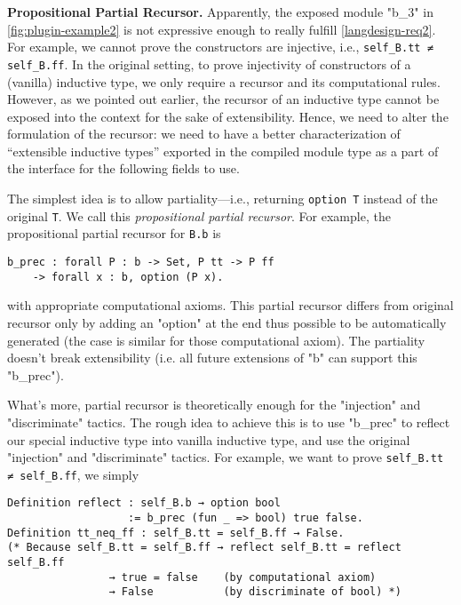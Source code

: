\textbf{Propositional Partial Recursor.}
Apparently, the exposed module "b_3" in \cref{fig:plugin-example2} is
not expressive enough to really fulfill \ref{langdesign-req2}. For
example, we cannot prove the constructors are injective, i.e.,
\texttt{self_B.tt ≠ self_B.ff}. In the original setting, to
prove injectivity of constructors of a (vanilla) inductive type, we only
require a recursor and its computational rules. However, as we pointed
out earlier, the recursor of an inductive type cannot be exposed into
the context for the sake of extensibility. Hence, we need to alter the
formulation of the recursor: we need to have a better
characterization of ``extensible inductive types'' exported in the
compiled module type as a part of the interface for the following fields
to use.


The simplest idea is to allow partiality---i.e., returning
\texttt{option T} instead of the original \texttt{T}.
We call this \textit{propositional partial recursor}.
For example, the propositional partial recursor for \texttt{B.b} is
\begin{verbatim}
b_prec : forall P : b -> Set, P tt -> P ff
    -> forall x : b, option (P x).
\end{verbatim}
with appropriate computational axioms. This partial recursor differs from original recursor only by adding an "option" at the end thus possible to be automatically generated (the case is similar for those computational axiom). The partiality doesn't break
extensibility (i.e. all future extensions of "b" can support this
"b_prec"). 

What's more, partial recursor is theoretically enough for the
"injection" and "discriminate" tactics. The rough idea to achieve this
is to use "b_prec" to reflect our special inductive type into vanilla
inductive type, and use the original "injection" and "discriminate"
tactics. For example, we want to prove \texttt{self_B.tt ≠
self_B.ff}, we simply 
\begin{verbatim}
Definition reflect : self_B.b → option bool 
                   := b_prec (fun _ => bool) true false.
Definition tt_neq_ff : self_B.tt = self_B.ff → False.
(* Because self_B.tt = self_B.ff → reflect self_B.tt = reflect self_B.ff 
                → true = false    (by computational axiom)
                → False           (by discriminate of bool) *)
\end{verbatim}




